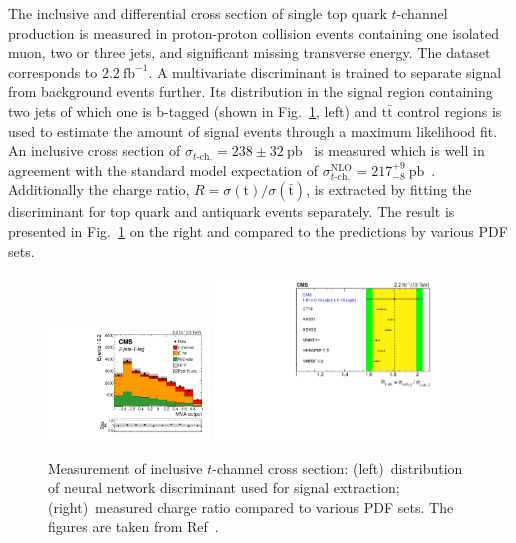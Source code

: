 \documentclass[12pt]{article}
\begin{document}
The inclusive and differential cross section of single top quark $t$-channel production is measured in proton-proton collision events containing one isolated muon, two or three jets, and significant missing transverse energy. The dataset corresponds to $2.2~\mathrm{fb}^{-1}$. A multivariate discriminant is trained to separate signal from background events further. Its distribution in the signal region containing two jets of which one is b-tagged (shown in Fig.~\ref{fig:t-channel}, left) and $\mathrm{t}\bar{\mathrm{t}}$ control regions is used to estimate the amount of signal events through a maximum likelihood fit. An inclusive cross section of $\sigma_{t\mathrm{\mbox{-}ch.}}=238\pm32~\mathrm{pb}$~\cite{tchannel-inc} is measured which is well in agreement with the standard model expectation of $\sigma_{t\mathrm{\mbox{-}ch.}}^\mathrm{NLO}=217^{+9}_{-8}~\mathrm{pb}$~\cite{hathor}. Additionally the charge ratio, $R=\sigma(\mathrm{t})/\sigma(\bar{\mathrm{t}})$, is extracted by fitting the discriminant for top quark and antiquark events separately. The result is presented in Fig.~\ref{fig:t-channel} on the right and compared to the predictions by various PDF sets.

\begin{figure}[!htb]
\begin{center}
\includegraphics[width=0.38\textwidth]{tch-nn.pdf}\hspace{0.02\textwidth}
\includegraphics[width=0.55\textwidth]{tch-ratio.pdf}
\caption{\label{fig:t-channel}Measurement of inclusive $t$-channel cross section: (left)~distribution of neural network discriminant used for signal extraction; (right)~measured charge ratio compared to various PDF sets. The figures are taken from Ref~\cite{tchannel-inc}.}
\end{center}
\end{figure}
\end{document}
